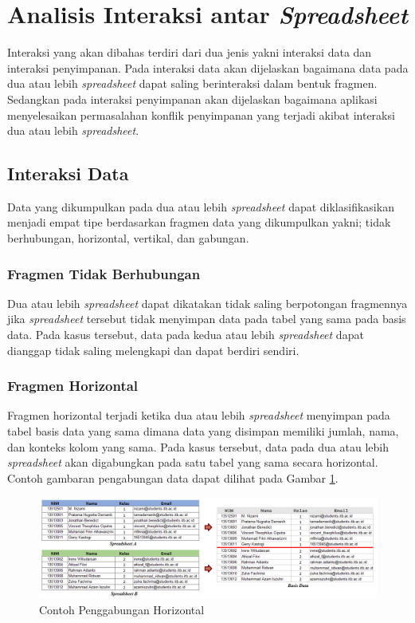 \section{Analisis Interaksi antar \textit{Spreadsheet}}
Interaksi yang akan dibahas terdiri dari dua jenis yakni interaksi data dan interaksi penyimpanan. Pada interaksi data akan dijelaskan bagaimana data pada dua atau lebih \textit{spreadsheet} dapat saling berinteraksi dalam bentuk fragmen. Sedangkan pada interaksi penyimpanan akan dijelaskan bagaimana aplikasi menyelesaikan permasalahan konflik penyimpanan yang terjadi akibat interaksi dua atau lebih \textit{spreadsheet}.

\subsection{Interaksi Data}
Data yang dikumpulkan pada dua atau lebih \textit{spreadsheet} dapat diklasifikasikan menjadi empat tipe berdasarkan fragmen data yang dikumpulkan yakni; tidak berhubungan, horizontal, vertikal, dan gabungan.
	\subsubsection{Fragmen Tidak Berhubungan}
	Dua atau lebih \textit{spreadsheet} dapat dikatakan tidak saling berpotongan fragmennya jika \textit{spreadsheet} tersebut tidak menyimpan data pada tabel yang sama pada basis data. Pada kasus tersebut, data pada kedua atau lebih \textit{spreadsheet} dapat dianggap tidak saling melengkapi dan dapat berdiri sendiri.
	
	\subsubsection{Fragmen Horizontal}
	Fragmen horizontal terjadi ketika dua atau lebih \textit{spreadsheet} menyimpan pada tabel basis data yang sama dimana data yang disimpan memiliki jumlah, nama, dan konteks kolom yang sama. Pada kasus tersebut, data pada dua atau lebih \textit{spreadsheet} akan digabungkan pada satu tabel yang sama secara horizontal. Contoh gambaran pengabungan data dapat dilihat pada Gambar \ref{HorizontalMerge}.

	\begin{figure}[htb]
	    \centering
	    \includegraphics[width=1\textwidth]{resources/chapter-3-horizontal-merge.png}
	    \caption{Contoh Penggabungan Horizontal}
		\label{HorizontalMerge}
	\end{figure}

